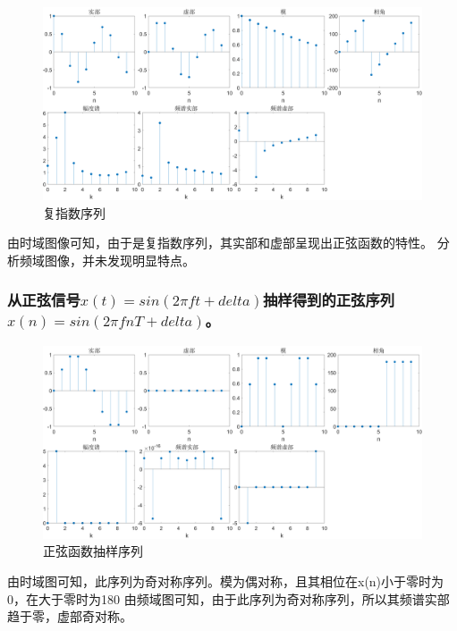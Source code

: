 \documentclass{../source/Experiment}
\begin{document}
            \begin{figure}[H]
                \centering
                \includegraphics[width = \textwidth]{src/2_1_2}
                \caption{复指数序列}
            \end{figure}

            由时域图像可知，由于是复指数序列，其实部和虚部呈现出正弦函数的特性。
            分析频域图像，并未发现明显特点。

            \subsubsection{从正弦信号$x(t)=sin(2\pi ft+delta)$抽样得到的正弦序列$x(n)=sin(2\pi fnT+delta)$。}

            \begin{figure}[H]
                \centering
                \includegraphics[width = \textwidth]{src/2_1_3.png}
                \caption{正弦函数抽样序列}
            \end{figure}

            由时域图可知，此序列为奇对称序列。模为偶对称，且其相位在x(n)小于零时为0，在大于零时为180\degree
            由频域图可知，由于此序列为奇对称序列，所以其频谱实部趋于零，虚部奇对称。
\end{document}

